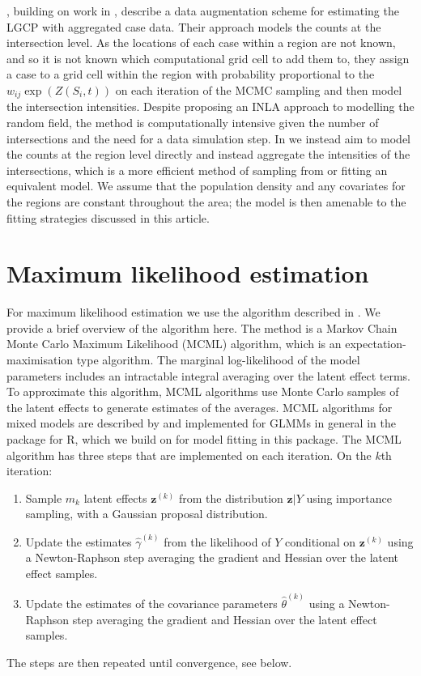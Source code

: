 \citet{Li2012}, building on work in \citet{Li2012b}, describe a data augmentation scheme for estimating the LGCP with aggregated case data. Their approach models the counts at the intersection level. As the locations of each case within a region are not known, and so it is not known which computational grid cell to add them to, they assign a case to a grid cell within the region with probability proportional to the $w_{ij} \exp\left( Z(S_i,t) \right)$ on each iteration of the MCMC sampling and then model the intersection intensities. Despite proposing an INLA approach to modelling the random field, the method is computationally intensive given the number of intersections and the need for a data simulation step. In  we instead aim to model the counts at the region level directly and instead aggregate the intensities of the intersections, which is a more efficient method of sampling from or fitting an equivalent model. We assume that the population density and any covariates for the regions are constant throughout the area; the model is then amenable to the fitting strategies discussed in this article. 

\section{Maximum likelihood estimation}
For maximum likelihood estimation we use the algorithm described in \citet{Watson2026}. We provide a brief overview of the algorithm here. The method is a Markov Chain Monte Carlo Maximum Likelihood (MCML) algorithm, which is an expectation-maximisation type algorithm. The marginal log-likelihood of the model parameters includes an intractable integral averaging over the latent effect terms. To approximate this algorithm, MCML algorithms use Monte Carlo samples of the latent effects to generate estimates of the averages. MCML algorithms for mixed models are described by \citet{McCulloch1997} and implemented for GLMMs in general in the  package for R, which we build on for model fitting in this package. The MCML algorithm has three steps that are implemented on each iteration. On the $k$th iteration:
\begin{enumerate}
    \item Sample $m_k$ latent effects $\mathbf{z}^{(k)}$ from the distribution $\mathbf{z}|Y$ using importance sampling, with a Gaussian proposal distribution.
    \item Update the estimates $\hat{\gamma}^{(k)}$ from the likelihood of $Y$ conditional on $\mathbf{z}^{(k)}$ using a Newton-Raphson step averaging the gradient and Hessian over the latent effect samples. 
    \item Update the estimates of the covariance parameters $\hat{\theta}^{(k)}$ using a Newton-Raphson step averaging the gradient and Hessian over the latent effect samples. 
\end{enumerate}
The steps are then repeated until convergence, see below. 

